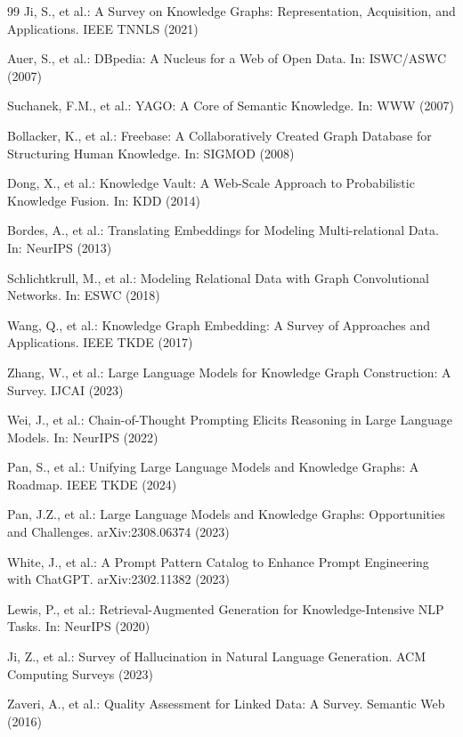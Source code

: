 \documentclass[runningheads]{llncs}
\begin{document}
\begin{thebibliography}{99}
Ji, S., et al.: A Survey on Knowledge Graphs: Representation, Acquisition, and Applications. IEEE TNNLS (2021)

Auer, S., et al.: DBpedia: A Nucleus for a Web of Open Data. In: ISWC/ASWC (2007)

Suchanek, F.M., et al.: YAGO: A Core of Semantic Knowledge. In: WWW (2007)

Bollacker, K., et al.: Freebase: A Collaboratively Created Graph Database for Structuring Human Knowledge. In: SIGMOD (2008)

Dong, X., et al.: Knowledge Vault: A Web-Scale Approach to Probabilistic Knowledge Fusion. In: KDD (2014)

Bordes, A., et al.: Translating Embeddings for Modeling Multi-relational Data. In: NeurIPS (2013)

Schlichtkrull, M., et al.: Modeling Relational Data with Graph Convolutional Networks. In: ESWC (2018)

Wang, Q., et al.: Knowledge Graph Embedding: A Survey of Approaches and Applications. IEEE TKDE (2017)

Zhang, W., et al.: Large Language Models for Knowledge Graph Construction: A Survey. IJCAI (2023)

Wei, J., et al.: Chain-of-Thought Prompting Elicits Reasoning in Large Language Models. In: NeurIPS (2022)

Pan, S., et al.: Unifying Large Language Models and Knowledge Graphs: A Roadmap. IEEE TKDE (2024)

Pan, J.Z., et al.: Large Language Models and Knowledge Graphs: Opportunities and Challenges. arXiv:2308.06374 (2023)

White, J., et al.: A Prompt Pattern Catalog to Enhance Prompt Engineering with ChatGPT. arXiv:2302.11382 (2023)

Lewis, P., et al.: Retrieval-Augmented Generation for Knowledge-Intensive NLP Tasks. In: NeurIPS (2020)

Ji, Z., et al.: Survey of Hallucination in Natural Language Generation. ACM Computing Surveys (2023)

Zaveri, A., et al.: Quality Assessment for Linked Data: A Survey. Semantic Web (2016)


\end{thebibliography}
\end{document}
